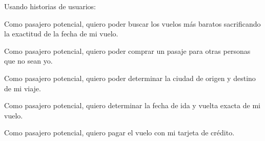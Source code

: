 Usando historias de usuarios:

Como pasajero potencial, quiero poder buscar los vuelos más baratos sacrificando la exactitud de la fecha de mi vuelo.

Como pasajero potencial, quiero poder comprar un pasaje para otras personas que no sean yo.

Como pasajero potencial, quiero poder determinar la ciudad de origen y destino de mi viaje.

Como pasajero potencial, quiero determinar la fecha de ida y vuelta exacta de mi vuelo.

Como pasajero potencial, quiero pagar el vuelo con mi tarjeta de crédito.


